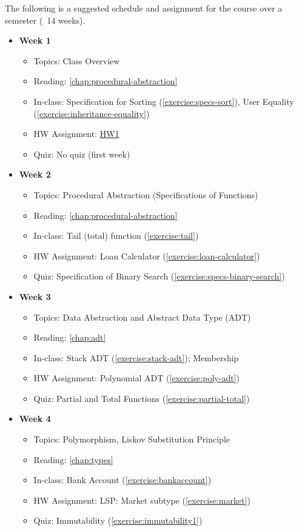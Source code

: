 \documentclass[oneside,11pt,dvipsnames]{book}
\begin{document}
The following is a suggested schedule and assignment for the course over a semester (~14 weeks).

\begin{itemize}
    \item \textbf{Week 1}
    \begin{itemize}
        \item Topics: Class Overview
        \item Reading: \autoref{chap:procedural-abstraction}
        \item In-class: Specification for Sorting (\autoref{exercise:specs-sort}), User Equality (\autoref{exercise:inheritance-equality})
        \item HW Assignment: \href{#hw1}{HW1}
        \item Quiz: No quiz (first week)
    \end{itemize}

    \item \textbf{Week 2}
    \begin{itemize}
        \item Topics: Procedural Abstraction (Specifications of Functions)
        \item Reading: \autoref{chap:procedural-abstraction}
        \item In-class: Tail (total) function (\autoref{exercise:tail})
        \item HW Assignment: Loan Calculator (\autoref{exercise:loan-calculator})
        \item Quiz: Specification of Binary Search (\autoref{exercise:specs-binary-search})
    \end{itemize}

    \item \textbf{Week 3}
    \begin{itemize}
        \item Topics: Data Abstraction and Abstract Data Type (ADT)
        \item Reading: \autoref{chap:adt}
        \item In-class: Stack ADT (\autoref{exercise:stack-adt}); Membership
        \item HW Assignment: Polynomial ADT (\autoref{exercise:poly-adt})
        \item Quiz: Partial and Total Functions (\autoref{exercise:partial-total})
    \end{itemize}

    \item \textbf{Week 4}
    \begin{itemize}
        \item Topics: Polymorphism, Liskov Substitution Principle
        \item Reading: \autoref{chap:types}
        \item In-class: Bank Account (\autoref{exercise:bankaccount})
        \item HW Assignment: LSP: Market subtype (\autoref{exercise:market})
        \item Quiz: Immutability (\autoref{exercise:immutability1})
    \end{itemize}


\end{itemize}
\end{document}

